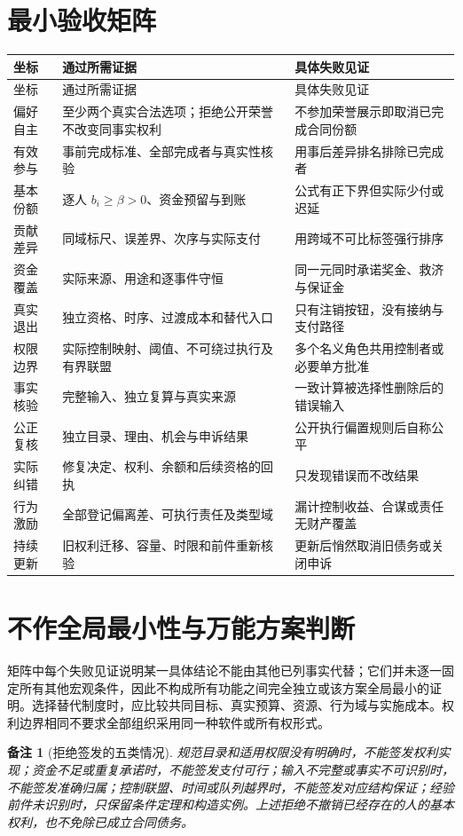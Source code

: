 \documentclass[12pt,a4paper,openany]{report}
\newtheorem{remark}{备注}[chapter]
\begin{document}
\begin{CJK*}{UTF8}{gkai}
\section{最小验收矩阵}
\begin{longtable}{L{0.12\textwidth}L{0.40\textwidth}L{0.39\textwidth}}
\toprule 坐标 & 通过所需证据 & 具体失败见证\\\midrule
\endfirsthead
\toprule 坐标 & 通过所需证据 & 具体失败见证\\\midrule
\endhead
偏好自主 & 至少两个真实合法选项；拒绝公开荣誉不改变同事实权利 & 不参加荣誉展示即取消已完成合同份额\\
有效参与 & 事前完成标准、全部完成者与真实性核验 & 用事后差异排名排除已完成者\\
基本份额 & 逐人 $b_i\ge\beta>0$、资金预留与到账 & 公式有正下界但实际少付或迟延\\
贡献差异 & 同域标尺、误差界、次序与实际支付 & 用跨域不可比标签强行排序\\
资金覆盖 & 实际来源、用途和逐事件守恒 & 同一元同时承诺奖金、救济与保证金\\
真实退出 & 独立资格、时序、过渡成本和替代入口 & 只有注销按钮，没有接纳与支付路径\\
权限边界 & 实际控制映射、阈值、不可绕过执行及有界联盟 & 多个名义角色共用控制者或必要单方批准\\
事实核验 & 完整输入、独立复算与真实来源 & 一致计算被选择性删除后的错误输入\\
公正复核 & 独立目录、理由、机会与申诉结果 & 公开执行偏置规则后自称公平\\
实际纠错 & 修复决定、权利、余额和后续资格的回执 & 只发现错误而不改结果\\
行为激励 & 全部登记偏离差、可执行责任及类型域 & 漏计控制收益、合谋或责任无财产覆盖\\
持续更新 & 旧权利迁移、容量、时限和前件重新核验 & 更新后悄然取消旧债务或关闭申诉\\
\bottomrule
\end{longtable}

\section{不作全局最小性与万能方案判断}
矩阵中每个失败见证说明某一具体结论不能由其他已列事实代替；它们并未逐一固定所有其他宏观条件，因此不构成所有功能之间完全独立或该方案全局最小的证明。选择替代制度时，应比较共同目标、真实预算、资源、行为域与实施成本。权利边界相同不要求全部组织采用同一种软件或所有权形式。

\begin{remark}[拒绝签发的五类情况]
规范目录和适用权限没有明确时，不能签发权利实现；资金不足或重复承诺时，不能签发支付可行；输入不完整或事实不可识别时，不能签发准确归属；控制联盟、时间或队列越界时，不能签发对应结构保证；经验前件未识别时，只保留条件定理和构造实例。上述拒绝不撤销已经存在的人的基本权利，也不免除已成立合同债务。
\end{remark}


\end{CJK*}
\end{document}
